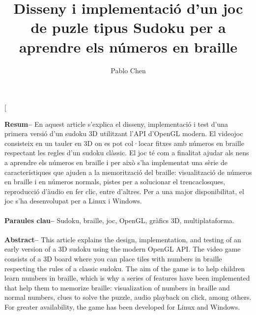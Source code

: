 ﻿\documentclass[10pt,a4paper,twocolumn,twoside]{article}
\author{\LARGE\sffamily Pablo Chen}
\title{\Huge{\sffamily Disseny i implementació d'un joc de puzle tipus Sudoku per a aprendre els números en braille}}
\date{}
\begin{document}
\fancyhead[RO]{\thepage}
\fancyhead[LE]{\thepage}

\fancyfoot[CO,CE]{}

{
    \fancyhf{}
}

\renewcommand{\headrulewidth}{0pt}
\renewcommand{\footrulewidth}{0pt}
\pagestyle{fancy}

\twocolumn[\begin{@twocolumnfalse}

        \maketitle

        \thispagestyle{primerapagina}
        \begin{center}
            \parbox{0.915\textwidth} {\sffamily

                \textbf{Resum--} En aquest article s'explica el disseny, implementació i test d'una primera versió d'un sudoku 3D utilitzant l'API d'OpenGL modern. El videojoc consisteix en un tauler en 3D on es pot col·locar fitxes amb números en braille respectant les regles d'un sudoku clàssic. El joc té com a finalitat ajudar als nens a aprendre els números en braille i per això s'ha implementat una sèrie de característiques que ajuden a la memorització del braille: visualització de números en braille i en números normals, pistes per a solucionar el trencaclosques, reproducció d'àudio en fer clic, entre d'altres. Per a una major disponibilitat, el joc s'ha desenvolupat per a Linux i Windows. \\ \bigskip \\
                \textbf{Paraules clau-- } Sudoku, braille, joc, OpenGL, gràfics 3D, multiplataforma.\\ \bigskip \\

                \textbf{Abstract--} This article explains the design, implementation, and testing of an early version of a 3D sudoku using the modern OpenGL API. The video game consists of a 3D board where you can place tiles with numbers in braille respecting the rules of a classic sudoku. The aim of the game is to help children learn numbers in braille, which is why a series of features have been implemented that help them to memorize braille: visualization of numbers in braille and normal numbers, clues to solve the puzzle, audio playback on click, among others. For greater availability, the game has been developed for Linux and Windows. \ \bigskip \\

}
\end{center}
\end{@twocolumnfalse}
\end{document}

